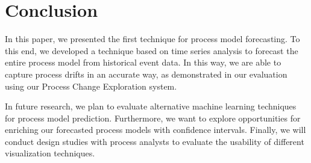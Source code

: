 \section{Conclusion}\label{sec:conclusion}
In this paper, we presented the first technique for process model forecasting. To this end, we developed a
technique based on time series analysis to forecast the entire process model from historical event data. In this way, we are able to capture process drifts in an accurate way, as demonstrated in our evaluation using our Process Change Exploration system. 

In future research, we plan to evaluate alternative machine learning techniques for process model prediction. Furthermore, we want to explore opportunities for enriching our forecasted process models with confidence intervals. Finally, we will conduct design studies with process analysts to evaluate the usability of different visualization techniques.